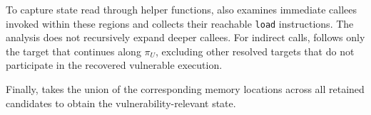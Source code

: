 To capture state read through helper functions, \sys also examines immediate callees invoked within these regions and collects their reachable \texttt{load} instructions. The analysis does not recursively expand deeper callees. For indirect calls, \sys follows only the target that continues along $\pi_U$, excluding other resolved targets that do not participate in the recovered vulnerable execution.

Finally, \sys takes the union of the corresponding memory locations
across all retained candidates to obtain the vulnerability-relevant state.









